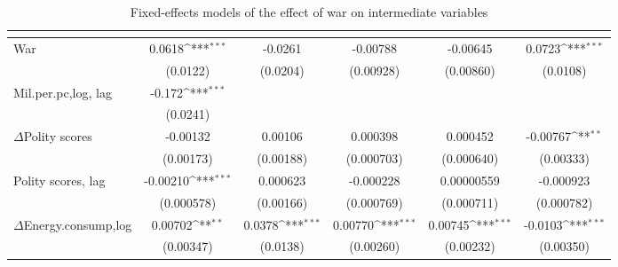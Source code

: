 \begin{table}[htbp]\centering
\def\sym#1{\ifmmode^{#1}\else\(^{#1}\)\fi}
\caption{Fixed-effects models of the effect of war on intermediate variables\label{FEintermed}}
\begin{tabular}{l*{5}{c}}
\hline\hline
                    &&&&&\\
\hline
War           &      0.0618\sym{***}&     -0.0261         &    -0.00788         &    -0.00645         &      0.0723\sym{***}\\
                    &    (0.0122)         &    (0.0204)         &   (0.00928)         &   (0.00860)         &    (0.0108)         \\
[1em]
Mil.per.pc,log, lag      &      -0.172\sym{***}&                     &                     &                     &                     \\
                    &    (0.0241)         &                     &                     &                     &                     \\
[1em]
$\Delta$Polity scores          &    -0.00132         &     0.00106         &    0.000398         &    0.000452         &    -0.00767\sym{**} \\
                    &   (0.00173)         &   (0.00188)         &  (0.000703)         &  (0.000640)         &   (0.00333)         \\
[1em]
Polity scores, lag           &    -0.00210\sym{***}&    0.000623         &   -0.000228         &  0.00000559         &   -0.000923         \\
                    &  (0.000578)         &   (0.00166)         &  (0.000769)         &  (0.000711)         &  (0.000782)         \\
[1em]
$\Delta$Energy.consump,log           &     0.00702\sym{**} &      0.0378\sym{***}&     0.00770\sym{***}&     0.00745\sym{***}&     -0.0103\sym{***}\\
                    &   (0.00347)         &    (0.0138)         &   (0.00260)         &   (0.00232)         &   (0.00350)         \\

\end{tabular}
\end{table}
